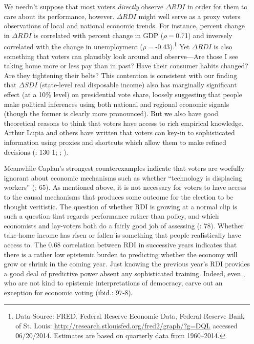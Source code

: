 \documentclass[11pt]{article}
\begin{document}
We needn't suppose that most voters \emph{directly} observe $\Delta
RDI$ in order for them to care about its performance, however. $\Delta RDI$ might well serve as
a proxy voters observations of local and national economic
trends. For instance, percent change in $\Delta
RDI$ is correlated with percent change in GDP
($\rho=$0.71) and inversely correlated with the change in  unemployment
($\rho=$-0.43).\footnote{Data Source: FRED, Federal Reserve Economic
  Data, Federal Reserve Bank of St. Louis:
  \url{http://research.stlouisfed.org/fred2/graph/?g=DQL} accessed
  06/20/2014. Estimates are based on quarterly data from 1960--2014.}
 Yet $\Delta RDI$ is also something that voters can plausibly look around and
observe---Are those I see taking home more or less pay than in past?
Have their consumer habits changed? Are they tightening their belts? This contention is consistent with our finding that $\Delta SDI$ (state-level real disposable income) also has marginally significant effect (at a 10\% level) on presidential vote share, loosely suggesting that people make political inferences using both national and regional economic signals (though the former is clearly more pronounced). 
But we also have good theoretical reasons to think that voters 
have access to rich empirical knowledge. Arthur Lupia and others have written
that voters can key-in to sophisticated information using proxies
and shortcuts which allow them to make refined decisions (\citet{Kinder1981}: 130-1; \citet{Lupia2000};
\citet{Lupia2006}).

Meanwhile Caplan's strongest counterexamples  indicate that voters are woefully ignorant about economic mechanisms such as whether ``technology is displacing workers'' (\cite{Caplan2006}: 65). As mentioned above, it is not necessary for voters to have access to the causal mechanisms that produces some outcome for the election to be thought veritistic. The question of whether RDI is growing at a normal clip is such a question that regards performance rather than policy, and which economists and lay-voters both do a fairly good job of assessing (\cite{Caplan2006}: 78). Whether take-home income has risen or fallen is something that people realistically have access to. The 0.68 correlation between RDI in successive years indicates that there is a rather low epistemic burden to predicting whether the economy will grow or shrink in the coming year. Just knowing the previous year's RDI provides a good deal of predictive power absent any sophisticated training. Indeed, even \cite{achen2016democracy}, who are not kind to epistemic interpretations of democracy, carve out an exception for economic voting (ibid.: 97-8).
\end{document}
